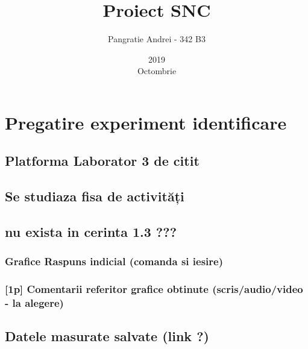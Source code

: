 \documentclass[12pt,english]{article}
\title{Proiect SNC}
\date{2019\\ Octombrie}
\author{Pangratie Andrei - 342 B3}
\begin{document}
\maketitle
\newpage

\tableofcontents
\newpage

\section { Pregatire experiment identificare }
\subsection { Platforma Laborator 3 de citit }
\subsection { Se studiaza fisa de activități }
\subsection { nu exista in cerinta 1.3 ??? }
\subsubsection { Grafice Raspuns indicial (comanda si iesire) }
\begin{center}
\end{center}

\subsubsection { [1p] Comentarii referitor grafice obtinute (scris/audio/video - la alegere) }
\subsection { Datele masurate salvate (link ?) }
\end{document}
